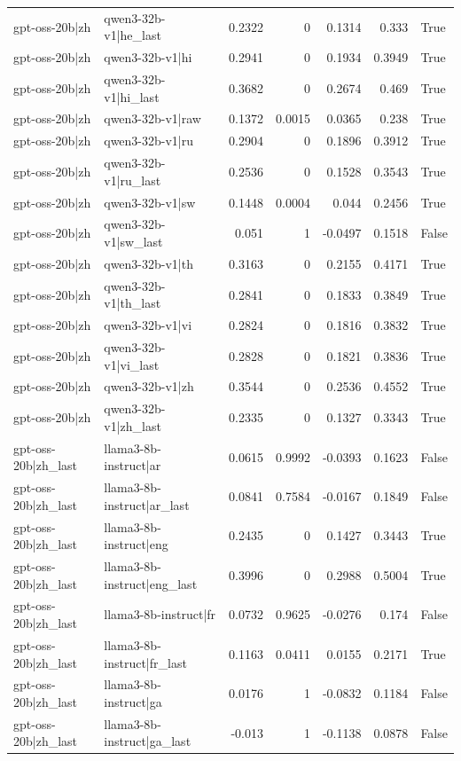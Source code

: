 \begin{table}
\begin{tabular}{l l r r r r l}
gpt-oss-20b|zh & qwen3-32b-v1|he_last & 0.2322 & 0 & 0.1314 & 0.333 & True \\
gpt-oss-20b|zh & qwen3-32b-v1|hi & 0.2941 & 0 & 0.1934 & 0.3949 & True \\
gpt-oss-20b|zh & qwen3-32b-v1|hi_last & 0.3682 & 0 & 0.2674 & 0.469 & True \\
gpt-oss-20b|zh & qwen3-32b-v1|raw & 0.1372 & 0.0015 & 0.0365 & 0.238 & True \\
gpt-oss-20b|zh & qwen3-32b-v1|ru & 0.2904 & 0 & 0.1896 & 0.3912 & True \\
gpt-oss-20b|zh & qwen3-32b-v1|ru_last & 0.2536 & 0 & 0.1528 & 0.3543 & True \\
gpt-oss-20b|zh & qwen3-32b-v1|sw & 0.1448 & 0.0004 & 0.044 & 0.2456 & True \\
gpt-oss-20b|zh & qwen3-32b-v1|sw_last & 0.051 & 1 & -0.0497 & 0.1518 & False \\
gpt-oss-20b|zh & qwen3-32b-v1|th & 0.3163 & 0 & 0.2155 & 0.4171 & True \\
gpt-oss-20b|zh & qwen3-32b-v1|th_last & 0.2841 & 0 & 0.1833 & 0.3849 & True \\
gpt-oss-20b|zh & qwen3-32b-v1|vi & 0.2824 & 0 & 0.1816 & 0.3832 & True \\
gpt-oss-20b|zh & qwen3-32b-v1|vi_last & 0.2828 & 0 & 0.1821 & 0.3836 & True \\
gpt-oss-20b|zh & qwen3-32b-v1|zh & 0.3544 & 0 & 0.2536 & 0.4552 & True \\
gpt-oss-20b|zh & qwen3-32b-v1|zh_last & 0.2335 & 0 & 0.1327 & 0.3343 & True \\
gpt-oss-20b|zh_last & llama3-8b-instruct|ar & 0.0615 & 0.9992 & -0.0393 & 0.1623 & False \\
gpt-oss-20b|zh_last & llama3-8b-instruct|ar_last & 0.0841 & 0.7584 & -0.0167 & 0.1849 & False \\
gpt-oss-20b|zh_last & llama3-8b-instruct|eng & 0.2435 & 0 & 0.1427 & 0.3443 & True \\
gpt-oss-20b|zh_last & llama3-8b-instruct|eng_last & 0.3996 & 0 & 0.2988 & 0.5004 & True \\
gpt-oss-20b|zh_last & llama3-8b-instruct|fr & 0.0732 & 0.9625 & -0.0276 & 0.174 & False \\
gpt-oss-20b|zh_last & llama3-8b-instruct|fr_last & 0.1163 & 0.0411 & 0.0155 & 0.2171 & True \\
gpt-oss-20b|zh_last & llama3-8b-instruct|ga & 0.0176 & 1 & -0.0832 & 0.1184 & False \\
gpt-oss-20b|zh_last & llama3-8b-instruct|ga_last & -0.013 & 1 & -0.1138 & 0.0878 & False \\

\end{tabular}
\end{table}
